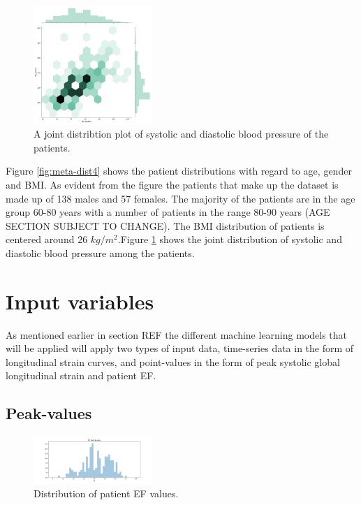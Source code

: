 \begin{figure}
    \begin{center}
    \includegraphics[width=0.4\textwidth]{data-exp/bp.png}
    \end{center}
    \caption{A joint distribtion plot of systolic and diastolic blood pressure of the patients.}
    \label{fig:bp-dist}
\end{figure}

Figure \ref{fig:meta-dist4} shows the patient distributions with regard to age, gender and BMI. As evident from the figure the patients that make up the dataset is made up of 138 males and 57 females. The majority of the patients are in the age group 60-80 years with a number of patients in the range 80-90 years (AGE SECTION SUBJECT TO CHANGE). The BMI distribution of patients is centered around 26 $kg/m^2$.Figure \ref{fig:bp-dist} shows the joint distribution of systolic and diastolic blood pressure among the patients.

\section{Input variables} \label{sec:covariates}
As mentioned earlier in section REF the different machine learning models that will be applied will apply two types of input data, time-series data in the form of longitudinal strain curves, and point-values in the form of peak systolic global longitudinal strain and patient EF.

\subsection{Peak-values}

\begin{figure}
    \begin{center}
    \includegraphics[width=0.4\textwidth]{data-exp/EF_dist.png}
    \end{center}
    \caption{Distribution of patient EF values.}
    \label{fig:}
\end{figure}

